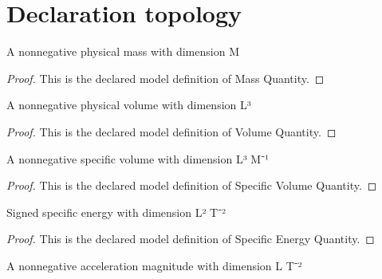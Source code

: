\section{Declaration topology}
\begin{definition}
  \label{def:physics:phyx-mini-0454:phyxminiproblems-problemphyxmini0454-massquantity}
  A nonnegative physical mass with dimension M
\end{definition}
\begin{proof}
  This is the declared model definition of Mass Quantity.
\end{proof}
\begin{definition}
  \label{def:physics:phyx-mini-0454:phyxminiproblems-problemphyxmini0454-volumequantity}
  A nonnegative physical volume with dimension L³
\end{definition}
\begin{proof}
  This is the declared model definition of Volume Quantity.
\end{proof}
\begin{definition}
  \label{def:physics:phyx-mini-0454:phyxminiproblems-problemphyxmini0454-specificvolumequantity}
  A nonnegative specific volume with dimension L³ M⁻¹
\end{definition}
\begin{proof}
  This is the declared model definition of Specific Volume Quantity.
\end{proof}
\begin{definition}
  \label{def:physics:phyx-mini-0454:phyxminiproblems-problemphyxmini0454-specificenergyquantity}
  Signed specific energy with dimension L² T⁻²
\end{definition}
\begin{proof}
  This is the declared model definition of Specific Energy Quantity.
\end{proof}
\begin{definition}
  \label{def:physics:phyx-mini-0454:phyxminiproblems-problemphyxmini0454-accelerationquantity}
  A nonnegative acceleration magnitude with dimension L T⁻²
\end{definition}
